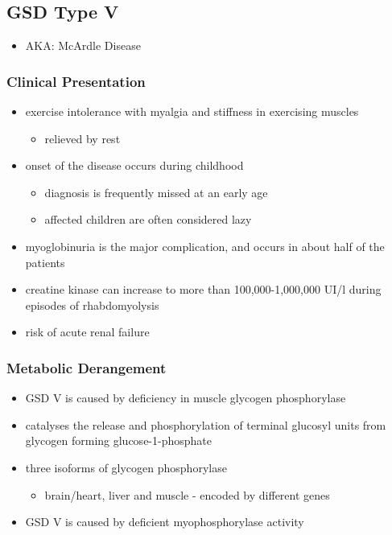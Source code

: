 \documentclass{scrartcl}
\begin{document}
\subsection{GSD Type V}
\label{sec:orgc4afd44}
\begin{itemize}
\item AKA: McArdle Disease
\end{itemize}
\subsubsection{Clinical Presentation}
\label{sec:org8f2ad5d}
\begin{itemize}
\item exercise intolerance with myalgia and stiffness in exercising muscles
\begin{itemize}
\item relieved by rest
\end{itemize}
\item onset of the disease occurs during childhood
\begin{itemize}
\item diagnosis is frequently missed at an early age
\item affected children are often considered lazy
\end{itemize}
\item myoglobinuria is the major complication, and occurs in about half of
the patients
\item creatine kinase can increase to more than 100,000-1,000,000
UI/l during episodes of rhabdomyolysis
\item risk of acute renal failure
\end{itemize}
\subsubsection{Metabolic Derangement}
\label{sec:org2a4fde9}
\begin{itemize}
\item GSD V is caused by deficiency in muscle glycogen phosphorylase
\item catalyses the release and phosphorylation of terminal glucosyl units
from glycogen forming glucose-1-phosphate
\item three isoforms of glycogen phosphorylase
\begin{itemize}
\item brain/heart, liver and muscle - encoded by different genes
\end{itemize}
\item GSD V is caused by deficient myophosphorylase activity
\end{itemize}
\end{document}
